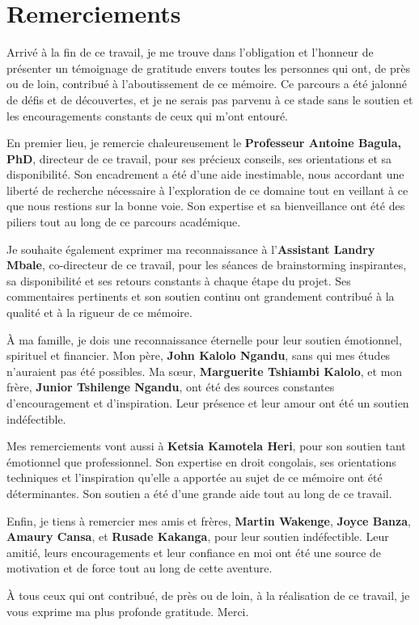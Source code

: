 

\begingroup

\let\clearpage\relax
\let\cleardoublepage\relax
\let\cleardoublepage\relax
{}
\chapter*{Remerciements}

Arrivé à la fin de ce travail, je me trouve dans l'obligation et l'honneur de présenter un témoignage de gratitude envers toutes les personnes qui ont, de près ou de loin, contribué à l'aboutissement de ce mémoire. Ce parcours a été jalonné de défis et de découvertes, et je ne serais pas parvenu à ce stade sans le soutien et les encouragements constants de ceux qui m'ont entouré.

En premier lieu, je remercie chaleureusement le \textbf{Professeur Antoine Bagula, PhD}, directeur de ce travail, pour ses précieux conseils, ses orientations et sa disponibilité. Son encadrement a été d’une aide inestimable, nous accordant une liberté de recherche nécessaire à l'exploration de ce domaine tout en veillant à ce que nous restions sur la bonne voie. Son expertise et sa bienveillance ont été des piliers tout au long de ce parcours académique.

Je souhaite également exprimer ma reconnaissance à l'\textbf{Assistant Landry Mbale}, co-directeur de ce travail, pour les séances de brainstorming inspirantes, sa disponibilité et ses retours constants à chaque étape du projet. Ses commentaires pertinents et son soutien continu ont grandement contribué à la qualité et à la rigueur de ce mémoire.

À ma famille, je dois une reconnaissance éternelle pour leur soutien émotionnel, spirituel et financier. Mon père, \textbf{John Kalolo Ngandu}, sans qui mes études n'auraient pas été possibles. Ma sœur, \textbf{Marguerite Tshiambi Kalolo}, et mon frère, \textbf{Junior Tshilenge Ngandu}, ont été des sources constantes d'encouragement et d'inspiration. Leur présence et leur amour ont été un soutien indéfectible.

Mes remerciements vont aussi à \textbf{Ketsia Kamotela Heri}, pour son soutien tant émotionnel que professionnel. Son expertise en droit congolais, ses orientations techniques et l'inspiration qu'elle a apportée au sujet de ce mémoire ont été déterminantes. Son soutien a été d'une grande aide tout au long de ce travail.

Enfin, je tiens à remercier mes amis et frères, \textbf{Martin Wakenge}, \textbf{Joyce Banza}, \textbf{Amaury Cansa}, et \textbf{Rusade Kakanga}, pour leur soutien indéfectible. Leur amitié, leurs encouragements et leur confiance en moi ont été une source de motivation et de force tout au long de cette aventure.

À tous ceux qui ont contribué, de près ou de loin, à la réalisation de ce travail, je vous exprime ma plus profonde gratitude. Merci.

\endgroup